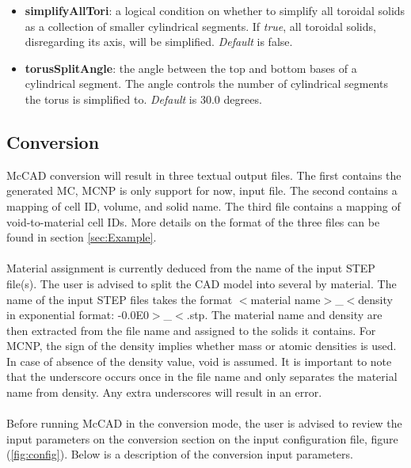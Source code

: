 \documentclass[12pt, a4paper, titlepage]{article}
\begin{document}
\begin{itemize}
	  \item \textbf{simplifyAllTori}: a logical condition on whether to simplify all toroidal solids as a collection of smaller cylindrical segments. If \emph{true}, all toroidal solids, disregarding its axis, will be simplified. \emph{Default} is false.
	  \item \textbf{torusSplitAngle}: the angle between the top and bottom bases of a cylindrical segment. The angle controls the number of cylindrical segments the torus is simplified to. \emph{Default} is 30.0 degrees.
    \end{itemize}

  \subsection{Conversion}
    McCAD conversion will result in three textual output files. The first contains the generated MC, MCNP is only support for now, input file. The second contains a mapping of cell ID, volume, and solid name. The third file contains a mapping of void-to-material cell IDs. More details on the format of the three files can be found in section \ref{sec:Example}. \\
    \\
    Material assignment is currently deduced from the name of the input STEP file(s). The user is advised to split the CAD model into several by material. The name of the input STEP files takes the format $<$material name$>$\_$<$density in exponential format: -0.0E0$>$\_$<$.stp. The material name and density are then extracted from the file name and assigned to the solids it contains. For MCNP, the sign of the density implies whether mass or atomic densities is used. In case of absence of the density value, void is assumed. It is important to note that the underscore occurs once in the file name and only separates the material name from density. Any extra underscores will result in an error. \\
    \\
    Before running McCAD in the conversion mode, the user is advised to review the input parameters on the conversion section on the input configuration file, figure (\ref{fig:config}). Below is a description of the conversion input parameters.
\end{document}
